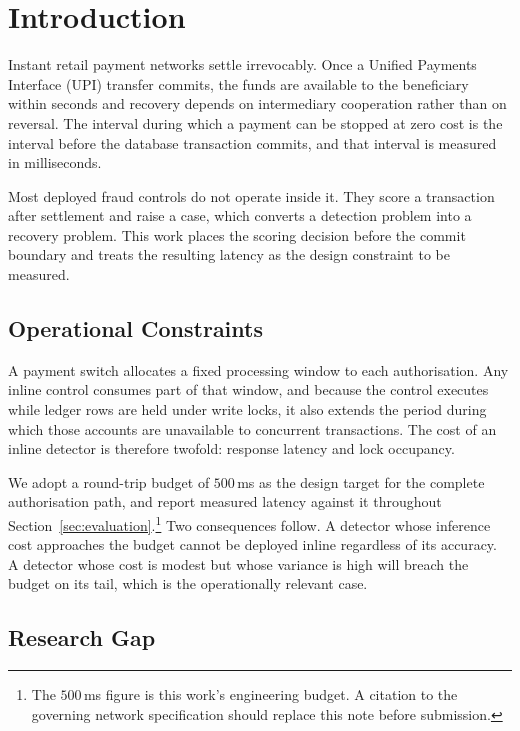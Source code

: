 \documentclass[conference]{IEEEtran}
\begin{document}
\section{Introduction}
\label{sec:introduction}

Instant retail payment networks settle irrevocably. Once a Unified
Payments Interface (UPI) transfer commits, the funds are available to
the beneficiary within seconds and recovery depends on intermediary
cooperation rather than on reversal. The interval during which a
payment can be stopped at zero cost is the interval before the database
transaction commits, and that interval is measured in milliseconds.

Most deployed fraud controls do not operate inside it. They score a
transaction after settlement and raise a case, which converts a
detection problem into a recovery problem. This work places the scoring
decision before the commit boundary and treats the resulting latency as
the design constraint to be measured.

\subsection{Operational Constraints}
\label{subsec:intro_constraints}

A payment switch allocates a fixed processing window to each
authorisation. Any inline control consumes part of that window, and
because the control executes while ledger rows are held under write
locks, it also extends the period during which those accounts are
unavailable to concurrent transactions. The cost of an inline detector
is therefore twofold: response latency and lock occupancy.

We adopt a round-trip budget of $500$\,ms as the design target for the
complete authorisation path, and report measured latency against it
throughout Section~\ref{sec:evaluation}.\footnote{The $500$\,ms figure
is this work's engineering budget. A citation to the governing network
specification should replace this note before submission.} Two
consequences follow. A detector whose inference cost approaches the
budget cannot be deployed inline regardless of its accuracy. A detector
whose cost is modest but whose variance is high will breach the budget
on its tail, which is the operationally relevant case.

\subsection{Research Gap}
\label{subsec:intro_gap}
\end{document}
